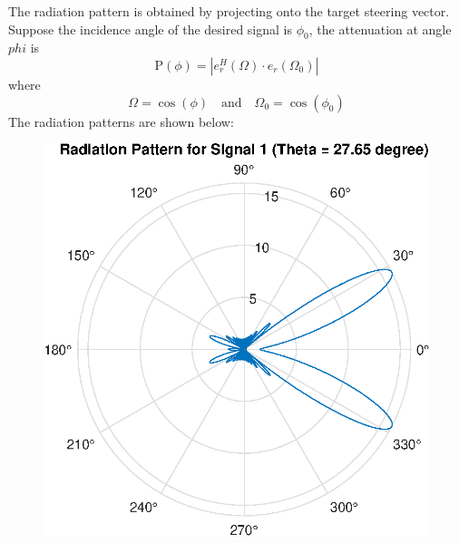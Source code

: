 The radiation pattern is obtained by projecting onto the target steering vector.
Suppose the incidence angle of the desired signal is $\phi_0$, the attenuation at angle 
$phi$ is
\begin{equation*}
    \text{P}\left(\phi\right) = \left|e_r^{H}(\Omega) \cdot e_r(\Omega_0)\right|
\end{equation*}
where
\begin{equation*}
    \Omega = \cos\left(\phi\right) \quad \text{and} \quad \Omega_0 = \cos\left(\phi_0\right)
\end{equation*}
The radiation patterns are shown below:
\begin{figure}[H]
    \centering
    \includegraphics[scale = 0.7]{s1.eps}
\end{figure}

